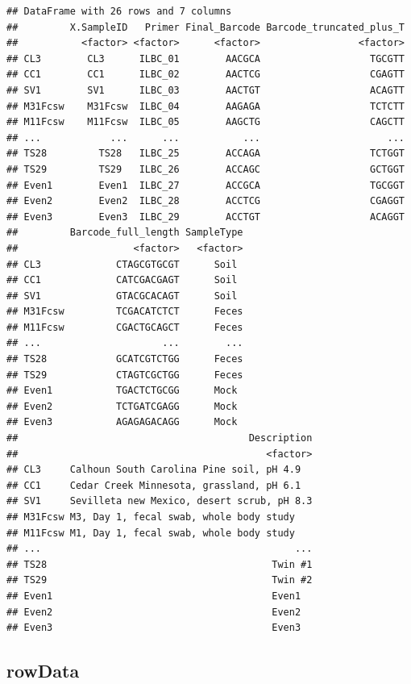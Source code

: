 \documentclass[
]{book}
\begin{document}
\begin{verbatim}
## DataFrame with 26 rows and 7 columns
##         X.SampleID   Primer Final_Barcode Barcode_truncated_plus_T
##           <factor> <factor>      <factor>                 <factor>
## CL3        CL3      ILBC_01        AACGCA                   TGCGTT
## CC1        CC1      ILBC_02        AACTCG                   CGAGTT
## SV1        SV1      ILBC_03        AACTGT                   ACAGTT
## M31Fcsw    M31Fcsw  ILBC_04        AAGAGA                   TCTCTT
## M11Fcsw    M11Fcsw  ILBC_05        AAGCTG                   CAGCTT
## ...            ...      ...           ...                      ...
## TS28         TS28   ILBC_25        ACCAGA                   TCTGGT
## TS29         TS29   ILBC_26        ACCAGC                   GCTGGT
## Even1        Even1  ILBC_27        ACCGCA                   TGCGGT
## Even2        Even2  ILBC_28        ACCTCG                   CGAGGT
## Even3        Even3  ILBC_29        ACCTGT                   ACAGGT
##         Barcode_full_length SampleType
##                    <factor>   <factor>
## CL3             CTAGCGTGCGT      Soil 
## CC1             CATCGACGAGT      Soil 
## SV1             GTACGCACAGT      Soil 
## M31Fcsw         TCGACATCTCT      Feces
## M11Fcsw         CGACTGCAGCT      Feces
## ...                     ...        ...
## TS28            GCATCGTCTGG      Feces
## TS29            CTAGTCGCTGG      Feces
## Even1           TGACTCTGCGG      Mock 
## Even2           TCTGATCGAGG      Mock 
## Even3           AGAGAGACAGG      Mock 
##                                        Description
##                                           <factor>
## CL3     Calhoun South Carolina Pine soil, pH 4.9  
## CC1     Cedar Creek Minnesota, grassland, pH 6.1  
## SV1     Sevilleta new Mexico, desert scrub, pH 8.3
## M31Fcsw M3, Day 1, fecal swab, whole body study   
## M11Fcsw M1, Day 1, fecal swab, whole body study   
## ...                                            ...
## TS28                                       Twin #1
## TS29                                       Twin #2
## Even1                                      Even1  
## Even2                                      Even2  
## Even3                                      Even3
\end{verbatim}

\hypertarget{rowdata}{%
\subsection{rowData}\label{rowdata}}
\end{document}
